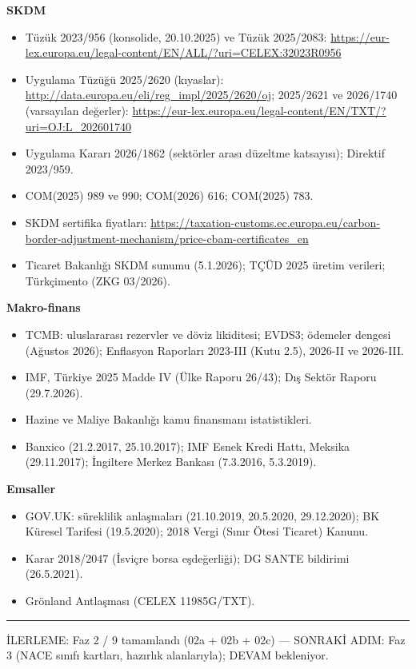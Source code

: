 \textbf{SKDM}

\begin{itemize}
\tightlist
\item
  Tüzük 2023/956 (konsolide, 20.10.2025) ve Tüzük 2025/2083: \url{https://eur-lex.europa.eu/legal-content/EN/ALL/?uri=CELEX:32023R0956}
\item
  Uygulama Tüzüğü 2025/2620 (kıyaslar): \url{http://data.europa.eu/eli/reg_impl/2025/2620/oj;} 2025/2621 ve 2026/1740 (varsayılan değerler): \url{https://eur-lex.europa.eu/legal-content/EN/TXT/?uri=OJ:L_202601740}
\item
  Uygulama Kararı 2026/1862 (sektörler arası düzeltme katsayısı); Direktif 2023/959.
\item
  COM(2025) 989 ve 990; COM(2026) 616; COM(2025) 783.
\item
  SKDM sertifika fiyatları: \url{https://taxation-customs.ec.europa.eu/carbon-border-adjustment-mechanism/price-cbam-certificates_en}
\item
  Ticaret Bakanlığı SKDM sunumu (5.1.2026); TÇÜD 2025 üretim verileri; Türkçimento (ZKG 03/2026).
\end{itemize}

\textbf{Makro-finans}

\begin{itemize}
\tightlist
\item
  TCMB: uluslararası rezervler ve döviz likiditesi; EVDS3; ödemeler dengesi (Ağustos 2026); Enflasyon Raporları 2023-III (Kutu 2.5), 2026-II ve 2026-III.
\item
  IMF, Türkiye 2025 Madde IV (Ülke Raporu 26/43); Dış Sektör Raporu (29.7.2026).
\item
  Hazine ve Maliye Bakanlığı kamu finansmanı istatistikleri.
\item
  Banxico (21.2.2017, 25.10.2017); IMF Esnek Kredi Hattı, Meksika (29.11.2017); İngiltere Merkez Bankası (7.3.2016, 5.3.2019).
\end{itemize}

\textbf{Emsaller}

\begin{itemize}
\tightlist
\item
  GOV.UK: süreklilik anlaşmaları (21.10.2019, 20.5.2020, 29.12.2020); BK Küresel Tarifesi (19.5.2020); 2018 Vergi (Sınır Ötesi Ticaret) Kanunu.
\item
  Karar 2018/2047 (İsviçre borsa eşdeğerliği); DG SANTE bildirimi (26.5.2021).
\item
  Grönland Antlaşması (CELEX 11985G/TXT).
\end{itemize}

\begin{center}\rule{0.5\linewidth}{0.5pt}\end{center}

\begin{gbilerleme}

İLERLEME: Faz 2 / 9 tamamlandı (02a + 02b + 02c) --- SONRAKİ ADIM: Faz 3 (NACE sınıfı kartları, hazırlık alanlarıyla); DEVAM bekleniyor.

\end{gbilerleme}
